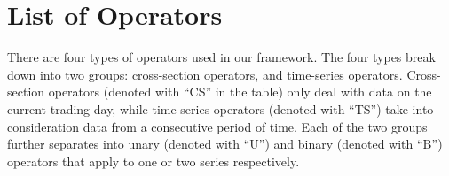 \section{List of Operators} \label{sec:ops}

There are four types of operators used in our framework. The four types break down into two groups: cross-section operators, and time-series operators. Cross-section operators (denoted with ``CS'' in the table) only deal with data on the current trading day, while time-series operators (denoted with ``TS'') take into consideration data from a consecutive period of time. Each of the two groups further separates into unary (denoted with ``U'') and binary (denoted with ``B'') operators that apply to one or two series respectively.
